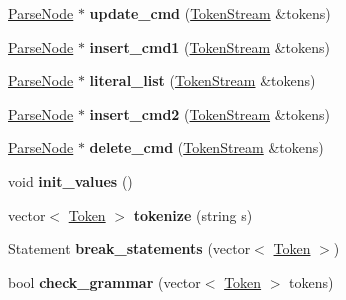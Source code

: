 \begin{DoxyCompactItemize}
\item 
\hypertarget{class_parser_aee56e9e1b7c8a2fcc4fa9cfb8e7454dc}{\hyperlink{struct_parse_node}{Parse\-Node} $\ast$ {\bfseries update\-\_\-cmd} (\hyperlink{class_token_stream}{Token\-Stream} \&tokens)}\label{class_parser_aee56e9e1b7c8a2fcc4fa9cfb8e7454dc}

\item 
\hypertarget{class_parser_a1724f6543438950d37b868fd8f78f337}{\hyperlink{struct_parse_node}{Parse\-Node} $\ast$ {\bfseries insert\-\_\-cmd1} (\hyperlink{class_token_stream}{Token\-Stream} \&tokens)}\label{class_parser_a1724f6543438950d37b868fd8f78f337}

\item 
\hypertarget{class_parser_a8cce8d4d29a543dcc6baa4f905d94f48}{\hyperlink{struct_parse_node}{Parse\-Node} $\ast$ {\bfseries literal\-\_\-list} (\hyperlink{class_token_stream}{Token\-Stream} \&tokens)}\label{class_parser_a8cce8d4d29a543dcc6baa4f905d94f48}

\item 
\hypertarget{class_parser_ad6c1e60d15b7c4af573fa36c86417793}{\hyperlink{struct_parse_node}{Parse\-Node} $\ast$ {\bfseries insert\-\_\-cmd2} (\hyperlink{class_token_stream}{Token\-Stream} \&tokens)}\label{class_parser_ad6c1e60d15b7c4af573fa36c86417793}

\item 
\hypertarget{class_parser_a7216e601459e66e825d8814f3f31523d}{\hyperlink{struct_parse_node}{Parse\-Node} $\ast$ {\bfseries delete\-\_\-cmd} (\hyperlink{class_token_stream}{Token\-Stream} \&tokens)}\label{class_parser_a7216e601459e66e825d8814f3f31523d}

\item 
\hypertarget{class_parser_ac96b9afc820eaef9a480f4048c6a8828}{void {\bfseries init\-\_\-values} ()}\label{class_parser_ac96b9afc820eaef9a480f4048c6a8828}

\item 
\hypertarget{class_parser_a8f1f1131b8ee415321749d7e9407beb1}{vector$<$ \hyperlink{struct_token}{Token} $>$ {\bfseries tokenize} (string s)}\label{class_parser_a8f1f1131b8ee415321749d7e9407beb1}

\item 
\hypertarget{class_parser_a9c573337bd17fd450e5dedbf776c4171}{Statement {\bfseries break\-\_\-statements} (vector$<$ \hyperlink{struct_token}{Token} $>$)}\label{class_parser_a9c573337bd17fd450e5dedbf776c4171}

\item 
\hypertarget{class_parser_a65ff44533bc25f4d3f4f7365fa776fa1}{bool {\bfseries check\-\_\-grammar} (vector$<$ \hyperlink{struct_token}{Token} $>$ tokens)}\label{class_parser_a65ff44533bc25f4d3f4f7365fa776fa1}


\end{DoxyCompactItemize}
